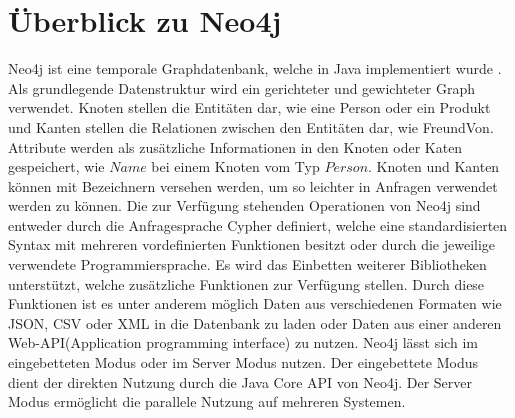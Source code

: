 \section{Überblick zu Neo4j}
Neo4j ist eine temporale Graphdatenbank, welche in Java implementiert wurde \parencite{vukotic2015neo4j}. Als grundlegende Datenstruktur wird ein gerichteter und gewichteter Graph verwendet. Knoten stellen die Entitäten dar, wie eine Person oder ein Produkt und  Kanten stellen die Relationen zwischen den Entitäten dar, wie FreundVon.  Attribute werden als zusätzliche Informationen in den Knoten oder Katen gespeichert, wie $Name$ bei einem Knoten vom Typ $Person$. Knoten und Kanten können mit Bezeichnern versehen werden, um so leichter in Anfragen  verwendet werden zu können. Die zur Verfügung stehenden Operationen von Neo4j sind entweder durch die  Anfragesprache  Cypher definiert, welche eine standardisierten Syntax mit  mehreren vordefinierten Funktionen besitzt oder durch die jeweilige verwendete Programmiersprache. Es wird das Einbetten weiterer Bibliotheken unterstützt, welche  zusätzliche Funktionen zur Verfügung stellen. Durch diese Funktionen ist es unter anderem möglich Daten aus verschiedenen Formaten wie JSON, CSV oder XML in die Datenbank zu laden oder Daten aus einer anderen Web-API(Application programming interface) zu nutzen. Neo4j lässt sich im eingebetteten Modus oder im  Server Modus nutzen. Der eingebettete Modus dient der direkten  Nutzung durch die Java Core API von Neo4j. Der Server Modus ermöglicht die parallele Nutzung auf mehreren Systemen. 

